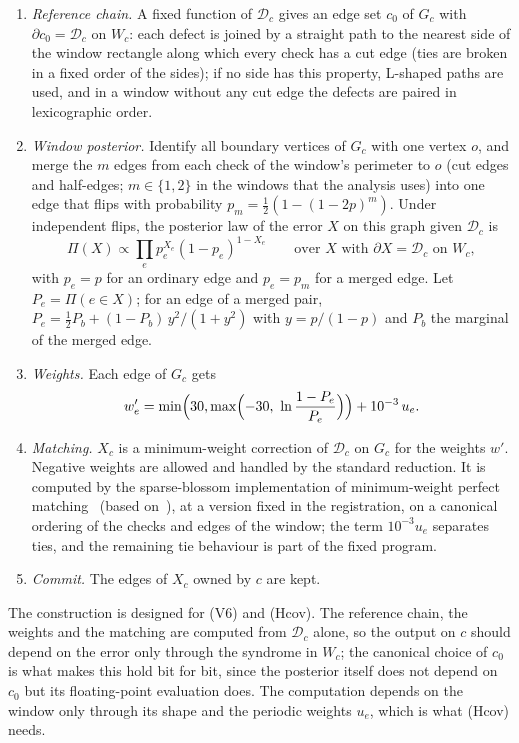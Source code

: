 \documentclass[11pt]{amsart}
\theoremstyle{definition}
\theoremstyle{remark}
\numberwithin{equation}{section}
\newcommand{\cD}{\mathcal{D}}
\begin{document}
\begin{enumerate}[label=(\roman*),leftmargin=2em]
\item \emph{Reference chain.} A fixed function of $\cD_c$ gives an edge set $c_0$ of $G_c$ with $\partial c_0=\cD_c$ on $W_c$: each defect is joined by a straight path to the nearest side of the window rectangle along which every check has a cut edge (ties are broken in a fixed order of the sides); if no side has this property, L-shaped paths are used, and in a window without any cut edge the defects are paired in lexicographic order.
\item \emph{Window posterior.} Identify all boundary vertices of $G_c$ with one vertex $o$, and merge the $m$ edges from each check of the window's perimeter to $o$ (cut edges and half-edges; $m\in\{1,2\}$ in the windows that the analysis uses) into one edge that flips with probability $p_m=\tfrac12(1-(1-2p)^m)$. Under independent flips, the posterior law of the error $X$ on this graph given $\cD_c$ is
\[
\Pi(X)\propto\prod_e p_e^{X_e}(1-p_e)^{1-X_e}\qquad\text{over }X\text{ with }\partial X=\cD_c\text{ on }W_c,
\]
with $p_e=p$ for an ordinary edge and $p_e=p_m$ for a merged edge. Let $P_e=\Pi(e\in X)$; for an edge of a merged pair, $P_e=\tfrac12P_b+(1-P_b)\,y^2/(1+y^2)$ with $y=p/(1-p)$ and $P_b$ the marginal of the merged edge.
\item \emph{Weights.} Each edge of $G_c$ gets
\begin{equation}\label{eq:cert-weights}
w'_e=\min\Bigl(30,\max\Bigl(-30,\ \ln\frac{1-P_e}{P_e}\Bigr)\Bigr)+10^{-3}\,u_e .
\end{equation}
\item \emph{Matching.} $X_c$ is a minimum-weight correction of $\cD_c$ on $G_c$ for the weights $w'$. Negative weights are allowed and handled by the standard reduction. It is computed by the sparse-blossom implementation of minimum-weight perfect matching~\cite{Hig22,HG25} (based on~\cite{Edm65}), at a version fixed in the registration, on a canonical ordering of the checks and edges of the window; the term $10^{-3}u_e$ separates ties, and the remaining tie behaviour is part of the fixed program.
\item \emph{Commit.} The edges of $X_c$ owned by $c$ are kept.
\end{enumerate}
The construction is designed for (V6) and (Hcov). The reference chain, the weights and the matching are computed from $\cD_c$ alone, so the output on $c$ should depend on the error only through the syndrome in $W_c$; the canonical choice of $c_0$ is what makes this hold bit for bit, since the posterior itself does not depend on $c_0$ but its floating-point evaluation does. The computation depends on the window only through its shape and the periodic weights $u_e$, which is what (Hcov) needs.
\end{document}
